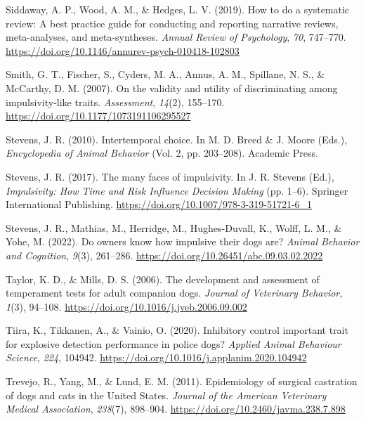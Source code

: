 \documentclass[
  ,pub,floatsintext]{apa6}
\newlength{\cslhangindent}
\newlength{\cslentryspacingunit} %
\newenvironment{CSLReferences}[2] %
 {%
  \setlength{\parindent}{0pt}
  \ifodd #1
  \let\oldpar\par
  \def\par{\hangindent=\cslhangindent\oldpar}
  \fi
  \setlength{\parskip}{#2\cslentryspacingunit}
 }%
 {}
\begin{document}
\begin{CSLReferences}{1}{0}
\leavevmode{}%
Siddaway, A. P., Wood, A. M., \& Hedges, L. V. (2019). How to do a systematic review: {A} best practice guide for conducting and reporting narrative reviews, meta-analyses, and meta-syntheses. \emph{Annual Review of Psychology}, \emph{70}, 747--770. \url{https://doi.org/10.1146/annurev-psych-010418-102803}

\leavevmode{}%
Smith, G. T., Fischer, S., Cyders, M. A., Annus, A. M., Spillane, N. S., \& McCarthy, D. M. (2007). On the validity and utility of discriminating among impulsivity-like traits. \emph{Assessment}, \emph{14}(2), 155--170. \url{https://doi.org/10.1177/1073191106295527}

\leavevmode{}%
Stevens, J. R. (2010). Intertemporal choice. In M. D. Breed \& J. Moore (Eds.), \emph{Encyclopedia of {Animal Behavior}} (Vol. 2, pp. 203--208). {Academic Press}.

\leavevmode{}%
Stevens, J. R. (2017). The many faces of impulsivity. In J. R. Stevens (Ed.), \emph{Impulsivity: {How Time} and {Risk Influence Decision Making}} (pp. 1--6). {Springer International Publishing}. \url{https://doi.org/10.1007/978-3-319-51721-6_1}

\leavevmode{}%
Stevens, J. R., Mathias, M., Herridge, M., Hughes-Duvall, K., Wolff, L. M., \& Yohe, M. (2022). Do owners know how impulsive their dogs are? \emph{Animal Behavior and Cognition}, \emph{9}(3), 261--286. \url{https://doi.org/10.26451/abc.09.03.02.2022}

\leavevmode{}%
Taylor, K. D., \& Mills, D. S. (2006). The development and assessment of temperament tests for adult companion dogs. \emph{Journal of Veterinary Behavior}, \emph{1}(3), 94--108. \url{https://doi.org/10.1016/j.jveb.2006.09.002}

\leavevmode{}%
Tiira, K., Tikkanen, A., \& Vainio, O. (2020). Inhibitory control \textendash{} important trait for explosive detection performance in police dogs? \emph{Applied Animal Behaviour Science}, \emph{224}, 104942. \url{https://doi.org/10.1016/j.applanim.2020.104942}

\leavevmode{}%
Trevejo, R., Yang, M., \& Lund, E. M. (2011). Epidemiology of surgical castration of dogs and cats in the {United States}. \emph{Journal of the American Veterinary Medical Association}, \emph{238}(7), 898--904. \url{https://doi.org/10.2460/javma.238.7.898}


\end{CSLReferences}
\end{document}
